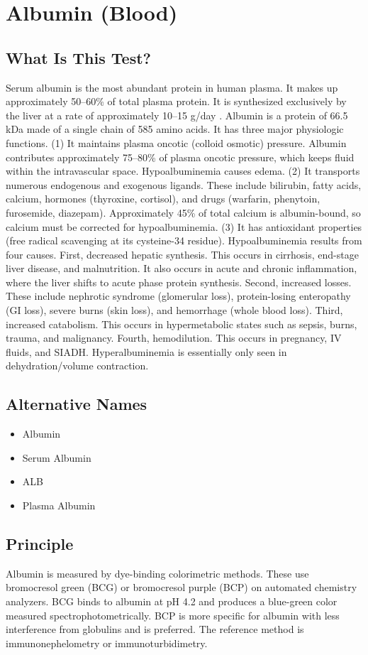 \chapter{Albumin (Blood)}
\section*{What Is This Test?}
Serum albumin is the most abundant protein in human plasma. It makes up approximately 50--60\% of total plasma protein. It is synthesized exclusively by the liver at a rate of approximately 10--15 g/day \cite{levitt2016human}. Albumin is a protein of 66.5 kDa made of a single chain of 585 amino acids. It has three major physiologic functions. (1) It maintains plasma oncotic (colloid osmotic) pressure. Albumin contributes approximately 75--80\% of plasma oncotic pressure, which keeps fluid within the intravascular space. Hypoalbuminemia causes edema. (2) It transports numerous endogenous and exogenous ligands. These include bilirubin, fatty acids, calcium, hormones (thyroxine, cortisol), and drugs (warfarin, phenytoin, furosemide, diazepam). Approximately 45\% of total calcium is albumin-bound, so calcium must be corrected for hypoalbuminemia. (3) It has antioxidant properties (free radical scavenging at its cysteine-34 residue). Hypoalbuminemia results from four causes. First, decreased hepatic synthesis. This occurs in cirrhosis, end-stage liver disease, and malnutrition. It also occurs in acute and chronic inflammation, where the liver shifts to acute phase protein synthesis. Second, increased losses. These include nephrotic syndrome (glomerular loss), protein-losing enteropathy (GI loss), severe burns (skin loss), and hemorrhage (whole blood loss). Third, increased catabolism. This occurs in hypermetabolic states such as sepsis, burns, trauma, and malignancy. Fourth, hemodilution. This occurs in pregnancy, IV fluids, and SIADH. Hyperalbuminemia is essentially only seen in dehydration/volume contraction.
\section*{Alternative Names}
\begin{itemize}
  \item Albumin
  \item Serum Albumin
  \item ALB
  \item Plasma Albumin
\end{itemize}
\section*{Principle}
Albumin is measured by dye-binding colorimetric methods. These use bromocresol green (BCG) or bromocresol purple (BCP) on automated chemistry analyzers. BCG binds to albumin at pH 4.2 and produces a blue-green color measured spectrophotometrically. BCP is more specific for albumin with less interference from globulins and is preferred. The reference method is immunonephelometry or immunoturbidimetry.

